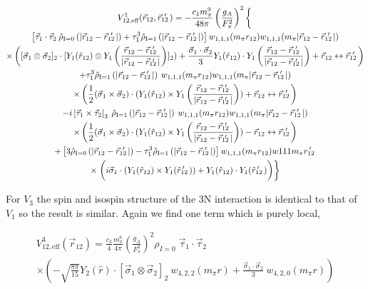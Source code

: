 \documentclass[%
 preprint,
 amsmath,amssymb,
 aps,
]{revtex4-1}
\newcommand{\rhohat}[2]{\hat{\rho}_{\text{I}=#1}\left( #2 \right)}
\newcommand{\rot}{\vec{r}_{12}}
\newcommand{\rotp}{\vec{r}_{12}\!\!\!'\,\,}
\newcommand{\rotpr}{r_{12}\!\!\!\!'\,\,\,}
\newcommand{\rotphat}{\hat{r}_{12}\!\!\!\!'\,\,\,}
\newcommand{\taudot}{\vec{\tau}_1\cdot\vec{\tau}_2}
\newcommand{\taucrossthree}{\left[\vec{\tau}_1\times\vec{\tau}_2\right]_3}
\newcommand{\sigmadot}{\vec{\sigma}_1\cdot\vec{\sigma}_2}
\newcommand{\sigmatwo}{[\vec{\sigma}_1\otimes\vec{\sigma}_2]_2}
\newcommand{\sigmacross}{\vec{\sigma}_1\times\vec{\sigma}_2}
\newcommand{\fracphantom}{\vphantom{\frac{1}{1}}}
\newcommand{\w}[4]{w_{#1,#2,#3}(#4)}
\begin{document}
\begin{multline}
V^{1}_{12,\text{eff}}(\rot,\rotp)=-\frac{c_1 m_\pi^9}{48\pi} \left(\frac{g_A}{F_\pi^2}\right)^2 
\left\{ \fracphantom \right. \\
\left[ \taudot \: \rhohat{0}{|\rot-\rotp|} + \tau_1^3 \rhohat{1}{|\rot-\rotp|} \right] \w{1}{1}{1}{ m_\pi r_{12}}\w{1}{1}{1}{ m_\pi | \rot-\rotp | } \\
\times \left( \sigmatwo \cdot [ Y_1 (\hat{r}_{12}) \otimes Y_1 \left(\frac{\rot-\rotp}{|\rot-\rotp|}\right) ]_2
 )  
 +\frac{\sigmadot}{3} Y_1 (\hat{r}_{12}) \cdot Y_1 \left(\frac{\rot-\rotp}{|\rot-\rotp|}\right)
+\rot\leftrightarrow\rotp\right) \\
%
+ \tau_1^3 \rhohat{1}{|\rot-\rotp|} \: \w{1}{1}{1}{m_\pi r_{12}} \w{1}{1}{1}{m_\pi | \rot-\rotp | } \\ 
\times \left(\fracphantom
\frac{1}{2}(\sigmacross)\cdot (Y_1 (\hat{r}_{12}) \times Y_1 \left(\frac{\rot-\rotp}{|\rot-\rotp|}\right) )+\rot\leftrightarrow\rotp\right) \\ 
%
- i \taucrossthree\: \rhohat{1}{|\rot-\rotp|} \: \w{1}{1}{1}{ m_\pi r_{12}}\w{1}{1}{1}{m_\pi | \rot-\rotp | }  \\
\times\left(\fracphantom
\frac{1}{2}(\sigmacross)\cdot (Y_1 (\hat{r}_{12}) \times Y_1 \left(\frac{\rot-\rotp}{|\rot-\rotp|}\right))-\rot\leftrightarrow\rotp\right) \\
%
+\left[3\rhohat{0}{|\rot-\rotp|}-\tau_1^3\rhohat{1}{|\rot-\rotp|}\right]\w{1}{1}{1}{ m_\pi r_{12}}w{1}{1}{1}{m_\pi \rotpr} \\
\times\left.\left(i\vec{\sigma}_1 \cdot (Y_1 (\hat{r}_{12}) \times Y_1(\rotphat)) + Y_1 (\hat{r}_{12}) \cdot Y_1(\rotphat) \fracphantom \right)
\right\}
\end{multline}

% 

For $V_3$ the spin and isospin structure of the 3N interaction is identical to that of $V_1$ so the result is similar. Again we find one term which is purely local,

\begin{multline}
V^{3}_{12,\text{eff}}(\rot)=\frac{c_3 }{4}\frac{m_\pi^6}{4\pi}\left(\frac{g_A}{F_\pi^2}\right)^2 \rho_{I=0}\;\taudot\:\\
 \times\left(-\sqrt{\frac{8\pi}{15}}Y_2(\hat{r})\cdot\sigmatwo\: \w{4}{2}{2}{m_\pi r} + \frac{\sigmadot}{3}\:  \w{4}{2}{0}{m_\pi r} \right)
\end{multline}
\end{document}
